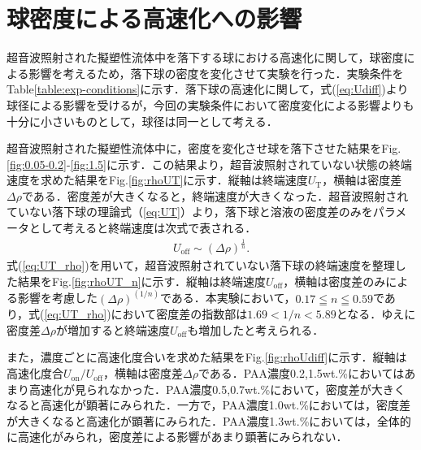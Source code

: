\section{球密度による高速化への影響}
\label{sec:density}
超音波照射された擬塑性流体中を落下する球における高速化に関して，球密度による影響を考えるため，落下球の密度を変化させて実験を行った．実験条件をTable\ref{table:exp-conditions}に示す．落下球の高速化に関して，式(\ref{eq:Udiff})より球径による影響を受けるが，今回の実験条件において密度変化による影響よりも十分に小さいものとして，球径は同一として考える．

超音波照射された擬塑性流体中に，密度を変化させ球を落下させた結果をFig.\ref{fig:0.05-0.2}-\ref{fig:1.5}に示す．この結果より，超音波照射されていない状態の終端速度を求めた結果をFig.\ref{fig:rhoUT}に示す．縦軸は終端速度$U_\text{T}$，横軸は密度差$\Delta\rho$である．密度差が大きくなると，終端速度が大きくなった．超音波照射されていない落下球の理論式（\ref{eq:UT}）より，落下球と溶液の密度差のみをパラメータとして考えると終端速度は次式で表される．
\begin{eqnarray}
    U_\text{off}\sim \left(\Delta\rho\right)^{\frac{1}{n}} .
    \label{eq:UT_rho}
\end{eqnarray}
式(\ref{eq:UT_rho})を用いて，超音波照射されていない落下球の終端速度を整理した結果をFig.\ref{fig:rhoUT_n}に示す．縦軸は終端速度$U_\text{off}$，横軸は密度差のみによる影響を考慮した$\left(\Delta\rho\right)^{\left(1/n\right)}$である．本実験において，$0.17\leqq n\leqq0.59$であり，式(\ref{eq:UT_rho})において密度差の指数部は$1.69<1/n<5.89$となる．ゆえに密度差$\Delta\rho$が増加すると終端速度$U_\text{off}$も増加したと考えられる．

また，濃度ごとに高速化度合いを求めた結果をFig.\ref{fig:rhoUdiff}に示す．縦軸は高速化度合$U_\text{on}/U_\text{off}$，横軸は密度差$\Delta\rho$である．PAA濃度0.2,1.5wt.\%においてはあまり高速化が見られなかった．PAA濃度0.5,0.7wt.\%において，密度差が大きくなると高速化が顕著にみられた．一方で，PAA濃度1.0wt.\%においては，密度差が大きくなると高速化が顕著にみられた．PAA濃度1.3wt.\%においては，全体的に高速化がみられ，密度差による影響があまり顕著にみられない．


